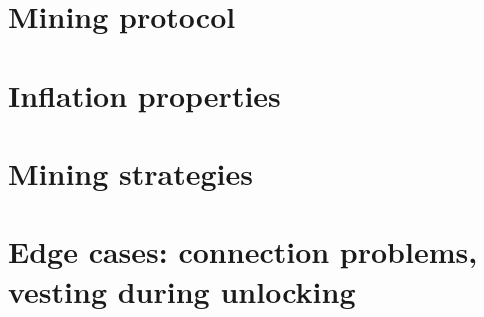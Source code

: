 \documentclass[longbibliography,nofootinbib,twocolumn]{revtex4-1}
\begin{document}
\section{Mining protocol}

\section{Inflation properties}

\section{Mining strategies}

\section{Edge cases: connection problems, vesting during unlocking}


\end{document}

